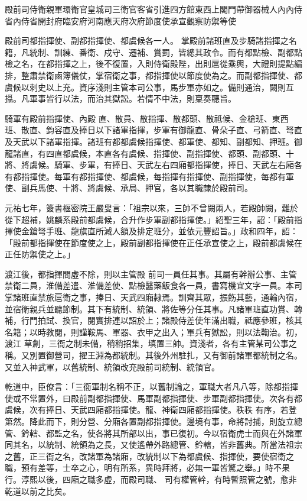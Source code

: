 
\begin{pinyinscope}

 殿前司侍衛親軍環衛官皇城司三衛官客省引進四方館東西上閣門帶御器械人內內侍省內侍省開封府臨安府河南應天府次府節度使承宣觀察防禦等使



 殿前司都指揮使、副都指揮使、都虞候各一人。
 掌殿前諸班直及步騎諸指揮之名籍，凡統制、訓練、番衛、戍守、遷補、賞罰，皆總其政令。而有都點檢、副都點檢之名，在都指揮之上，後不復置，入則侍衛殿陛，出則扈從乘輿，大禮則提點編排，整肅禁衛鹵簿儀仗，掌宿衛之事，都指揮使以節度使為之。而副都指揮使、都虞候以刺史以上充。資序淺則主管本司公事，馬步軍亦如之。備則通治，闕則互攝。凡軍事皆行以法，而治其獄訟。若情不中法，則稟奏聽旨。



 騎軍有殿前指揮使、內殿
 直、散員、散指揮、散都頭、散祗候、金槍班、東西班、散直、鈞容直及捧日以下諸軍指揮，步軍有御龍直、骨朵子直、弓箭直、弩直及天武以下諸軍指揮。諸班有都都虞候指揮使、都軍使、都知、副都知、押班。御龍諸直，有四直都虞候，本直各有虞候、指揮使、副指揮使、都頭、副都頭、十將、將虞候。騎軍、步軍，有捧日、天武左右四廂都指揮使，捧日、天武左右廂各有都指揮使。每軍有都指揮使、都虞候，每指揮有指揮使、副指揮使，每都有軍
 使、副兵馬使、十將、將虞候、承局、押官，各以其職隸於殿前司。



 元祐七年，簽書樞密院王嚴叟言：「祖宗以來，三帥不曾闕兩人，若殿帥闕，難於從下超補，姚麟系殿前都虞候，合升作步軍副都指揮使。」紹聖三年，詔：「殿前指揮使金鎗弩手班、龍旗直所減人額及排定班分，並依元豐詔旨。」政和四年，詔：「殿前都指揮使在節度使之上，殿前副都指揮使在正任承宣使之上，殿前都虞候在正任防禦使之上。」



 渡江後，都指揮間虛不除，則以主管殿
 前司一員任其事。其屬有幹辦公事、主管禁衛二員，淮備差遣、淮備差使、點檢醫藥飯食各一員，書寫機宜文字一員。本司掌諸班直禁旅扈衛之事，捧日、天武四廂隸焉。訓齊其眾，振飭其藝，通輪內宿，並宿衛親兵並聽節制。其下有統制、統領、將佐等分任其事。凡諸軍班直功賞、轉補，行門拍試、換官，閱實排連以詔於上；諸殿侍差使年滿出職，祗應參班，核其名籍；以時教閱，則謹鞍馬、軍器、衣甲之出入；軍兵有獄訟，則以法鞫治。初，渡江
 草創，三衙之制未備，稍稍招集，填置三帥。資淺者，各有主管某司公事之稱。又別置御營司，擢王淵為都統制。其後外州駐扎，又有御前諸軍都統制之名。又並入神武軍，以舊統制、統領改充殿前司統制、統領官。



 乾道中，臣僚言：「三衙軍制名稱不正，以舊制論之，軍職大者凡八等，除都指揮使或不常置外，曰殿前副都指揮使、馬軍副都指揮使、步軍副都指揮使。次各有都虞候，次有捧日、天武四廂都指揮使。龍、神衛四廂都指揮使。秩秩
 有序，若登第然。降此而下，則分營、分廂各置副都指揮使。邊境有事，命將討捕，則旋立總管、鈐轄、都監之名，使各將其所部以出，事已復初。今以宿衛虎士而與在外諸軍同其名，以統制、統領為之長，又使遙帶外路總管、鈐轄，皆非舊典。所當法祖宗之舊，正三衙之名，改諸軍為諸廂，改統制以下為都虞候、指揮使，要使宿衛之職，預有差等，士卒之心，明有所系，異時拜將，必無一軍皆驚之舉。」時不果行。淳熙以後，四廂之職多虛，而殿司職、
 司有權管幹，有時暫照管之號，愈非乾道以前之比矣。




\end{pinyinscope}
